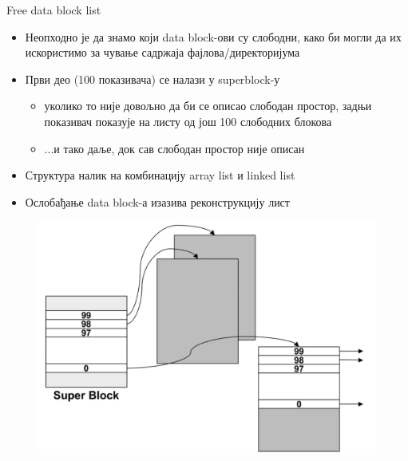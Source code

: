 \documentclass[xcolor=table]{beamer}
\begin{document}
    \begin{frame}[allowframebreaks]{Free data block list}
        \begin{itemize}
            \item Неопходно је да знамо који data block-ови су слободни, како би могли да их искористимо за чување садржаја фајлова/директоријума
            \item Први део (100 показивача) се налази у superblock-у
            \begin{itemize}
                \item уколико то није довољно да би се описао слободан простор, задњи показивач показује на листу од још 100 слободних блокова
                \item ...и тако даље, док сав слободан простор није описан
            \end{itemize}
            \item Структура налик на комбинацију array list и linked list
            \item Ослобађање data block-а изазива реконструкцију лист
        \end{itemize}
        
        \framebreak
        
        \begin{figure}
            \centering
            \includegraphics[width=\textwidth,height=0.8\textheight,keepaspectratio]{images/free_list.png}
            \label{fig:free_list.png}
        \end{figure}
    \end{frame}
    
\end{document}
